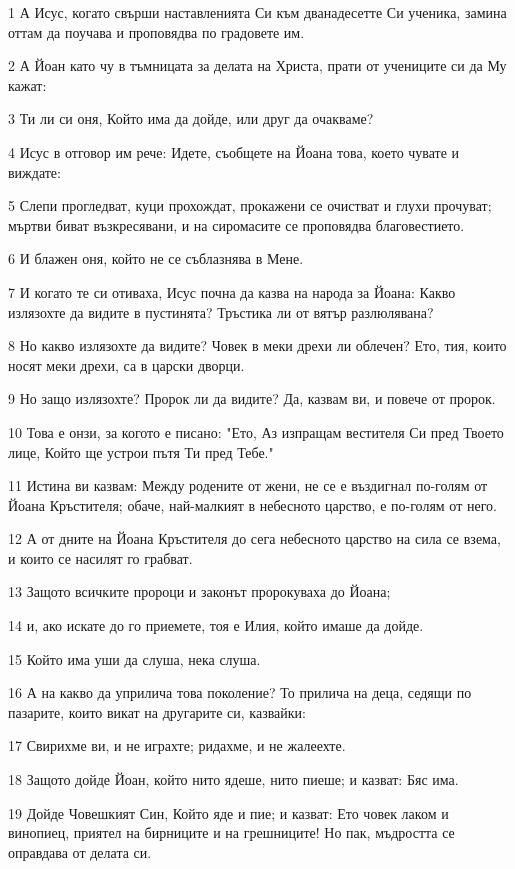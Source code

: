 \par 1 А Исус, когато свърши наставленията Си към дванадесетте Си ученика, замина оттам да поучава и проповядва по градовете им.
\par 2 А Йоан като чу в тъмницата за делата на Христа, прати от учениците си да Му кажат:
\par 3 Ти ли си оня, Който има да дойде, или друг да очакваме?
\par 4 Исус в отговор им рече: Идете, съобщете на Йоана това, което чувате и виждате:
\par 5 Слепи прогледват, куци прохождат, прокажени се очистват и глухи прочуват; мъртви биват възкресявани, и на сиромасите се проповядва благовестието.
\par 6 И блажен оня, който не се съблазнява в Мене.
\par 7 И когато те си отиваха, Исус почна да казва на народа за Йоана: Какво излязохте да видите в пустинята? Тръстика ли от вятър разлюлявана?
\par 8 Но какво излязохте да видите? Човек в меки дрехи ли облечен? Ето, тия, които носят меки дрехи, са в царски дворци.
\par 9 Но защо излязохте? Пророк ли да видите? Да, казвам ви, и повече от пророк.
\par 10 Това е онзи, за когото е писано: "Ето, Аз изпращам вестителя Си пред Твоето лице, Който ще устрои пътя Ти пред Тебе."
\par 11 Истина ви казвам: Между родените от жени, не се е въздигнал по-голям от Йоана Кръстителя; обаче, най-малкият в небесното царство, е по-голям от него.
\par 12 А от дните на Йоана Кръстителя до сега небесното царство на сила се взема, и които се насилят го грабват.
\par 13 Защото всичките пророци и законът пророкуваха до Йоана;
\par 14 и, ако искате до го приемете, тоя е Илия, който имаше да дойде.
\par 15 Който има уши да слуша, нека слуша.
\par 16 А на какво да уприлича това поколение? То прилича на деца, седящи по пазарите, които викат на другарите си, казвайки:
\par 17 Свирихме ви, и не играхте; ридахме, и не жалеехте.
\par 18 Защото дойде Йоан, който нито ядеше, нито пиеше; и казват: Бяс има.
\par 19 Дойде Човешкият Син, Който яде и пие; и казват: Ето човек лаком и винопиец, приятел на бирниците и на грешниците! Но пак, мъдростта се оправдава от делата си.
